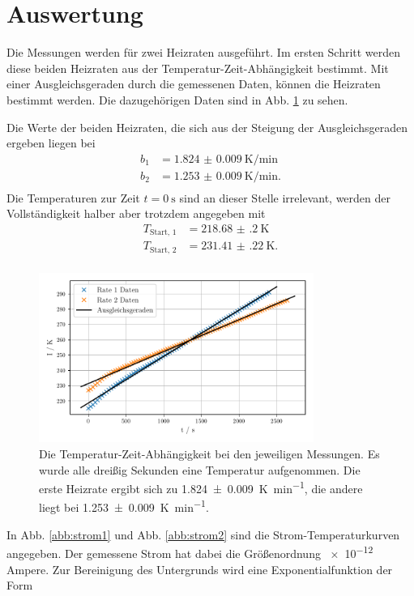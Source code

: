 \section{Auswertung}
\label{sec:Auswertung}

Die Messungen werden für zwei Heizraten ausgeführt. Im ersten Schritt werden diese beiden Heizraten aus der Temperatur-Zeit-Abhängigkeit bestimmt. Mit einer Ausgleichsgeraden durch die gemessenen Daten, können die Heizraten bestimmt werden. Die dazugehörigen Daten sind in Abb. \ref{abb:rate} zu sehen. 

Die Werte der beiden Heizraten, die sich aus der Steigung der Ausgleichsgeraden ergeben liegen bei 
\begin{align*}
    b_1 &= \SI{1.824(9)}{\kelvin\per\minute} \\
    b_2 &= \SI{1.253(9)}{\kelvin\per\minute}. \\
\end{align*}
Die Temperaturen zur Zeit $t=\SI{0}{\second}$ sind an dieser Stelle irrelevant, werden der Vollständigkeit halber aber trotzdem angegeben mit 
\begin{align*}
    T_\text{Start, 1} &= \SI{218.68(20)}{\kelvin} \\
    T_\text{Start, 2} &= \SI{231.41(22)}{\kelvin}. \\
\end{align*}
\begin{figure}
    \centering
    \includegraphics[width=0.8\textwidth]{figures/rate.pdf}
    \caption{Die Temperatur-Zeit-Abhängigkeit bei den jeweiligen Messungen. Es wurde alle dreißig Sekunden eine Temperatur aufgenommen. Die erste Heizrate ergibt sich zu \SI{1.824(9)}{\kelvin\per\minute}, die andere liegt bei \SI{1.253(9)}{\kelvin\per\minute}.}
    \label{abb:rate}
\end{figure}
In Abb. \ref{abb:strom1} und Abb. \ref{abb:strom2} sind die Strom-Temperaturkurven angegeben. Der gemessene Strom hat dabei die Größenordnung \num{e-12} Ampere. Zur Bereinigung des Untergrunds wird eine Exponentialfunktion der Form 
